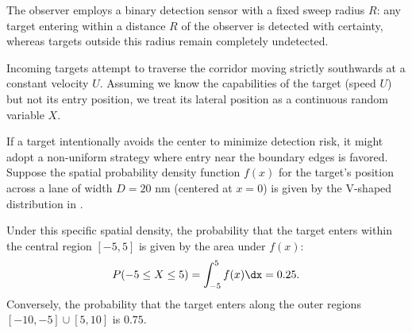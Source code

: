 \begin{example}
    The observer employs a binary detection sensor with a fixed sweep radius $R$: any target entering within a distance $R$ of the observer is detected with certainty, whereas targets outside this radius remain completely undetected.\medskip

    Incoming targets attempt to traverse the corridor moving strictly southwards at a constant velocity $U$. Assuming we know the capabilities of the target (speed $U$) but not its entry position, we treat its lateral position as a continuous random variable $X$. \medskip

    If a target intentionally avoids the center to minimize detection risk, it might adopt a non-uniform strategy where entry near the boundary edges is favored.
    Suppose the spatial probability density function $f(x)$ for the target's position across a lane of width $D=20\text{ nm}$ (centered at $x=0$) is given by the V-shaped distribution in .\medskip

    \begin{center}
        \label{fig:probability-density-function}
    \end{center}\medskip

    Under this specific spatial density, the probability that the target enters within the central region $[-5, 5]$ is given by the area under $f(x)$:
    \[
        P(-5 \le X \le 5) = \int_{-5}^{5} f(x)\dx = 0.25.
    \]
    Conversely, the probability that the target enters along the outer regions $[-10, -5] \cup [5, 10]$ is $0.75$.\medskip


\end{example}
